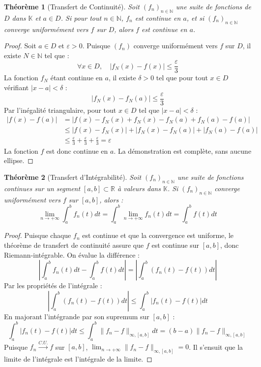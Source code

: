 \documentclass[11pt,a4paper]{article}
\newtheorem{theorem}{Théorème}
\begin{document}
\begin{theorem}[Transfert de Continuité]
Soit $(f_n)_{n \in \mathbb{N}}$ une suite de fonctions de $D$ dans $\mathbb{K}$ et $a \in D$.
Si pour tout $n \in \mathbb{N}$, $f_n$ est continue en $a$, et si $(f_n)_{n \in \mathbb{N}}$ converge uniformément vers $f$ sur $D$, alors $f$ est continue en $a$.
\end{theorem}

\begin{proof}
Soit $a \in D$ et $\varepsilon > 0$.
Puisque $(f_n)$ converge uniformément vers $f$ sur $D$, il existe $N \in \mathbb{N}$ tel que :
$$\forall x \in D, \quad |f_N(x) - f(x)| \le \frac{\varepsilon}{3}$$
La fonction $f_N$ étant continue en $a$, il existe $\delta > 0$ tel que pour tout $x \in D$ vérifiant $|x - a| < \delta$ :
$$|f_N(x) - f_N(a)| \le \frac{\varepsilon}{3}$$
Par l'inégalité triangulaire, pour tout $x \in D$ tel que $|x - a| < \delta$ :
\begin{align*}
|f(x) - f(a)| &= |f(x) - f_N(x) + f_N(x) - f_N(a) + f_N(a) - f(a)| \\
&\le |f(x) - f_N(x)| + |f_N(x) - f_N(a)| + |f_N(a) - f(a)| \\
&\le \frac{\varepsilon}{3} + \frac{\varepsilon}{3} + \frac{\varepsilon}{3} = \varepsilon
\end{align*}
La fonction $f$ est donc continue en $a$. La démonstration est complète, sans aucune ellipse.
\end{proof}

\begin{theorem}[Transfert d'Intégrabilité]
Soit $(f_n)_{n \in \mathbb{N}}$ une suite de fonctions continues sur un segment $[a, b] \subset \mathbb{R}$ à valeurs dans $\mathbb{K}$.
Si $(f_n)_{n \in \mathbb{N}}$ converge uniformément vers $f$ sur $[a, b]$, alors :
$$\lim_{n \to +\infty} \int_a^b f_n(t) dt = \int_a^b \lim_{n \to +\infty} f_n(t) dt = \int_a^b f(t) dt$$
\end{theorem}

\begin{proof}
Puisque chaque $f_n$ est continue et que la convergence est uniforme, le théorème de transfert de continuité assure que $f$ est continue sur $[a, b]$, donc Riemann-intégrable.
On évalue la différence :
$$\left| \int_a^b f_n(t) dt - \int_a^b f(t) dt \right| = \left| \int_a^b (f_n(t) - f(t)) dt \right|$$
Par les propriétés de l'intégrale :
$$\left| \int_a^b (f_n(t) - f(t)) dt \right| \le \int_a^b |f_n(t) - f(t)| dt$$
En majorant l'intégrande par son supremum sur $[a, b]$ :
$$\int_a^b |f_n(t) - f(t)| dt \le \int_a^b \|f_n - f\|_{\infty, [a, b]} dt = (b - a) \|f_n - f\|_{\infty, [a, b]}$$
Puisque $f_n \xrightarrow{C.U.} f$ sur $[a, b]$, $\lim_{n \to +\infty} \|f_n - f\|_{\infty, [a, b]} = 0$.
Il s'ensuit que la limite de l'intégrale est l'intégrale de la limite.
\end{proof}
\end{document}

